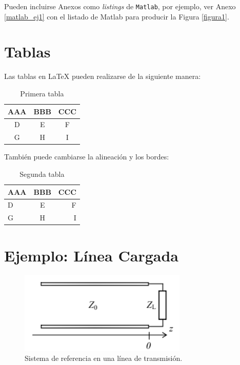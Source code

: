 \documentclass{article}
\begin{document}
Pueden incluirse Anexos como \textit{listings} de \texttt{Matlab}, por ejemplo, ver Anexo \ref{matlab_ej1} con el listado de Matlab para producir la Figura \ref{figura1}. %



\section{Tablas}

Las tablas en \LaTeX{} pueden realizarse de la siguiente manera:

\begin{table}[H]
\centering
\begin{tabular}{|c|c|c|}	%
\hline
AAA & BBB & CCC\\
\hline
D & E & F\\
\hline
G & H & I\\
\hline
\end{tabular}
\caption{Primera tabla}	%
\label{tabla1}			%
\end{table}

También puede cambiarse la alineación y los bordes:

\begin{table}[H]
\centering
\begin{tabular}{||l|c|r||}	%
\hline
AAA & BBB & CCC\\
\hline
\hline
D & E & F\\
\hline
G & H & I\\
\hline
\end{tabular}
\caption{Segunda tabla}	%
\label{tabla2}			%
\end{table}

\section{Ejemplo: Línea Cargada}

\begin{figure}[H]	%
 \centering			%
 \includegraphics[width = 8cm]{linea_sist_ref1}	%
 \caption{Sistema de referencia en una línea de transmisión.}	%
 \label{figura2}
\end{figure}
\end{document}
